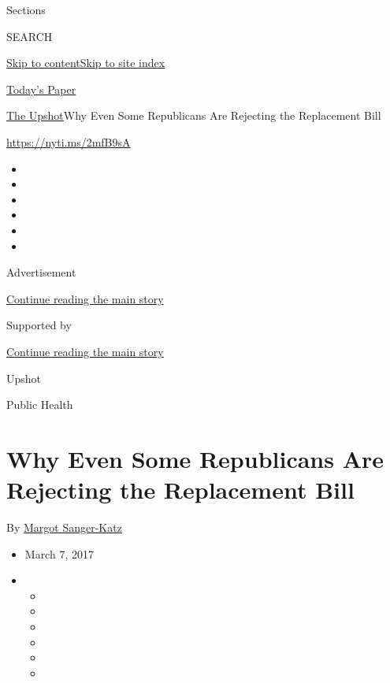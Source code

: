 Sections

SEARCH

\protect\hyperlink{site-content}{Skip to
content}\protect\hyperlink{site-index}{Skip to site index}

\href{https://myaccount.nytimes.com/auth/login?response_type=cookie\&client_id=vi}{}

\href{https://www.nytimes.com/section/todayspaper}{Today's Paper}

\href{/section/upshot}{The Upshot}\textbar{}Why Even Some Republicans
Are Rejecting the Replacement Bill

\url{https://nyti.ms/2mfB9sA}

\begin{itemize}
\item
\item
\item
\item
\item
\item
\end{itemize}

Advertisement

\protect\hyperlink{after-top}{Continue reading the main story}

Supported by

\protect\hyperlink{after-sponsor}{Continue reading the main story}

Upshot

Public Health

\hypertarget{why-even-some-republicans-are-rejecting-the-replacement-bill}{%
\section{Why Even Some Republicans Are Rejecting the Replacement
Bill}\label{why-even-some-republicans-are-rejecting-the-replacement-bill}}

By \href{http://www.nytimes.com/by/margot-sanger-katz}{Margot
Sanger-Katz}

\begin{itemize}
\item
  March 7, 2017
\item
  \begin{itemize}
  \item
  \item
  \item
  \item
  \item
  \item
  \end{itemize}
\end{itemize}

